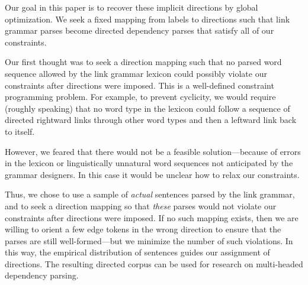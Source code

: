 \documentclass[11pt]{article}
\newcommand{\Note}[4][]{\todo[author=#2,color=#3,fancyline,#1]{#4}}
\newcommand{\noteJE}[2][]{\Note[#1]{JE}{green!40}{#2}}
\newcommand{\NoteJE}[2][]{\noteJE[inline,#1]{#2}}
\begin{document}
Our goal in this paper is to recover these implicit directions by global optimization.  We seek a fixed mapping from labels to directions such that link grammar parses become directed dependency parses that satisfy all of our constraints.

Our first thought was to seek a direction mapping such that no parsed word sequence allowed by the link grammar lexicon could possibly violate our constraints after directions were imposed.  This is a well-defined constraint programming problem.  For example, to prevent cyclicity, we would require (roughly speaking) that no word type in the lexicon could follow a sequence of directed rightward links through other word types and then a leftward link back to itself.  

However, we feared that there would not be a feasible solution---because of errors in the lexicon or linguistically unnatural word sequences not anticipated by the grammar designers.  In this case it would be unclear how to relax our constraints.

Thus, we chose to use a sample of {\em actual} sentences parsed by the link grammar, and to seek a direction mapping so that {\em these} parses would not violate our constraints after directions were imposed.  If no such mapping exists, then we are willing to orient a few edge tokens in the wrong direction to ensure that the parses are still well-formed---but we minimize the number of such violations.  In this way, the empirical distribution of sentences guides our assignment of directions.  The resulting directed corpus can be used for research on multi-headed dependency parsing.



\end{document}
